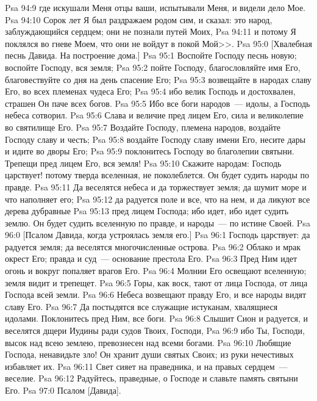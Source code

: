 \vs Psa 94:9 где искушали Меня отцы ваши, испытывали Меня, и видели дело Мое.
\vs Psa 94:10 Сорок лет Я был раздражаем родом сим, и сказал: это народ, заблуждающийся сердцем; они не познали путей Моих,
\vs Psa 94:11 и потому Я поклялся во гневе Моем, что они не войдут в покой Мой>>.
\vs Psa 95:0 [Хвалебная песнь Давида. На построение дома.]
\rsbpar\vs Psa 95:1 Воспойте Господу песнь новую; воспойте Господу, вся земля;
\vs Psa 95:2 пойте Господу, благословляйте имя Его, благовествуйте со дня на день спасение Его;
\vs Psa 95:3 возвещайте в народах славу Его, во всех племенах чудеса Его;
\vs Psa 95:4 ибо велик Господь и достохвален, страшен Он паче всех богов.
\vs Psa 95:5 Ибо все боги народов~--- идолы, а Господь небеса сотворил.
\vs Psa 95:6 Слава и величие пред лицем Его, сила и великолепие во святилище Его.
\vs Psa 95:7 Воздайте Господу, племена народов, воздайте Господу славу и честь;
\vs Psa 95:8 воздайте Господу славу имени Его, несите дары и идите во дворы Его;
\vs Psa 95:9 поклонитесь Господу во благолепии святыни. Трепещи пред лицем Его, вся земля!
\vs Psa 95:10 Скажите народам: Господь царствует! потому тверда вселенная, не поколеблется. Он будет судить народы по правде.
\vs Psa 95:11 Да веселятся небеса и да торжествует земля; да шумит море и что наполняет его;
\vs Psa 95:12 да радуется поле и все, что на нем, и да ликуют все дерева дубравные
\vs Psa 95:13 пред лицем Господа; ибо идет, ибо идет судить землю. Он будет судить вселенную по правде, и народы~--- по истине Своей.
\vs Psa 96:0 [Псалом Давида, когда устроялась земля его.]
\rsbpar\vs Psa 96:1 Господь царствует: да радуется земля; да веселятся многочисленные острова.
\vs Psa 96:2 Облако и мрак окрест Его; правда и суд~--- основание престола Его.
\vs Psa 96:3 Пред Ним идет огонь и вокруг попаляет врагов Его.
\vs Psa 96:4 Молнии Его освещают вселенную; земля видит и трепещет.
\vs Psa 96:5 Горы, как воск, тают от лица Господа, от лица Господа всей земли.
\vs Psa 96:6 Небеса возвещают правду Его, и все народы видят славу Его.
\vs Psa 96:7 Да постыдятся все служащие истуканам, хвалящиеся идолами. Поклонитесь пред Ним, все боги.
\vs Psa 96:8 Слышит Сион и радуется, и веселятся дщери Иудины ради судов Твоих, Господи,
\vs Psa 96:9 ибо Ты, Господи, высок над всею землею, превознесен над всеми богами.
\vs Psa 96:10 Любящие Господа, ненавидьте зло! Он хранит души святых Своих; из руки нечестивых избавляет их.
\vs Psa 96:11 Свет сияет на праведника, и на правых сердцем~--- веселие.
\vs Psa 96:12 Радуйтесь, праведные, о Господе и славьте память святыни Его.
\vs Psa 97:0 Псалом [Давида].
